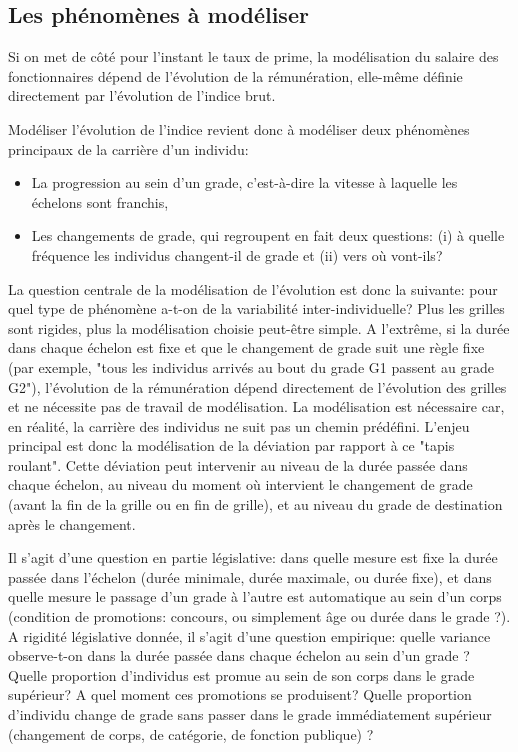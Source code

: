 \documentclass[11pt,a4paper]{article}
\begin{document}
\subsection*{Les phénomènes à modéliser}

Si on met de côté pour l'instant le taux de prime, la modélisation du salaire des fonctionnaires dépend de l'évolution de la rémunération, elle-même définie directement par l'évolution de l'indice brut. 

Modéliser l'évolution de l'indice revient donc à modéliser deux phénomènes principaux de la carrière d'un individu: 
\begin{itemize}[leftmargin=1cm ,parsep=0cm,itemsep=0cm,topsep=0cm] 
\item La progression au sein d'un grade, c'est-à-dire la vitesse à laquelle les échelons sont franchis,
\item Les changements de grade, qui regroupent en fait deux questions: (i) à quelle fréquence les individus changent-il de grade et (ii) vers où vont-ils? 
\end{itemize} 

\vspace{0.2cm}



La question centrale de la modélisation de l'évolution est donc la suivante: pour quel type de phénomène a-t-on de la variabilité inter-individuelle? Plus les grilles sont rigides, plus la modélisation choisie peut-être simple. A l'extrême, si la durée dans chaque échelon est fixe et que le changement de grade suit une règle fixe (par exemple, "tous les individus arrivés au bout du grade G1 passent au grade G2"), l'évolution de la rémunération dépend directement de l'évolution des grilles et ne nécessite pas de travail de modélisation. La modélisation est nécessaire car, en réalité, la carrière des individus ne suit pas un chemin prédéfini. L'enjeu principal est donc la modélisation de la déviation par rapport à ce "tapis roulant". Cette déviation peut intervenir au niveau de la durée passée dans chaque échelon, au niveau du moment où intervient le changement de grade (avant la fin de la grille ou en fin de grille), et au niveau du grade de destination après le changement. 

Il s'agit d'une question en partie législative: dans quelle mesure est fixe la durée passée dans l'échelon (durée minimale, durée maximale, ou durée fixe), et dans quelle mesure le passage d'un grade à l'autre est automatique au sein d'un corps (condition de promotions: concours, ou simplement âge ou durée dans le grade ?). A rigidité législative donnée, il s'agit d'une question empirique: quelle variance observe-t-on dans la durée passée dans chaque échelon au sein d'un grade ? Quelle proportion d'individus est promue au sein de son corps dans le grade supérieur? A quel moment ces promotions se produisent? Quelle proportion d'individu change de grade sans passer dans le grade immédiatement supérieur (changement de corps, de catégorie, de fonction publique) ?
\end{document}
